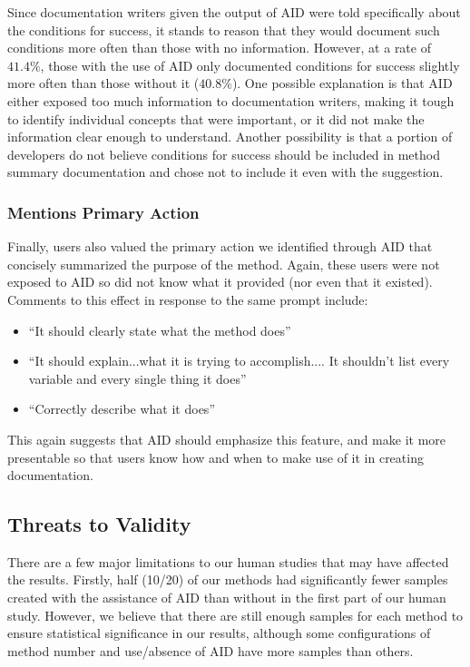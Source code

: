 \documentclass[preprint]{sigplanconf}
\begin{document}
Since documentation writers given the output of AID were told specifically about the conditions for success, it stands to reason that they would document such conditions more often than those with no information. However, at a rate of \(41.4\%\), those with the use of AID only documented conditions for success slightly more often than those without it (\(40.8\%\)). One possible explanation is that AID either exposed too much information to documentation writers, making it tough to identify individual concepts that were important, or it did not make the information clear enough to understand. Another possibility is that a portion of developers do not believe conditions for success should be included in method summary documentation and chose not to include it even with the suggestion.

\subsubsection{Mentions Primary Action}

Finally, users also valued the primary action we identified through AID that concisely summarized the purpose of the method. Again, these users were not exposed to AID so did not know what it provided (nor even that it existed). Comments to this effect in response to the same prompt include:

\begin{itemize}
\item ``It should clearly state what the method does''
\item ``It should explain...what it is trying to accomplish.... It shouldn't list every variable and every single thing it does''
\item ``Correctly describe what it does''
\end{itemize}

This again suggests that AID should emphasize this feature, and make it more presentable so that users know how and when to make use of it in creating documentation.

\subsection{Threats to Validity}
There are a few major limitations to our human studies that may have affected the results. Firstly, half (10/20) of our methods had significantly fewer samples created with the assistance of AID than without in the first part of our human study. However, we believe that there are still enough samples for each method to ensure statistical significance in our results, although some configurations of method number and use/absence of AID have more samples than others.
\end{document}
